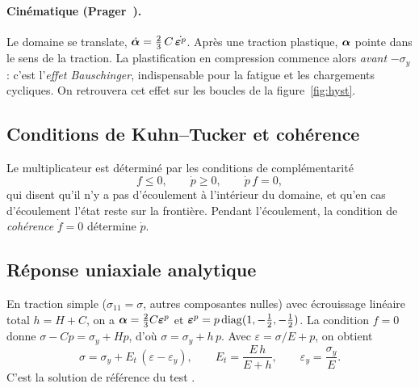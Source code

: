 \paragraph{Cinématique (Prager~\cite{prager1956}).} Le domaine se translate, $\dot{\boldsymbol{\alpha}} = \frac23\,C\,\dot{\boldsymbol{\varepsilon}^{p}}$. Après une traction plastique, $\boldsymbol{\alpha}$ pointe dans le sens de la traction. La plastification en compression commence alors \emph{avant} $-\sigma_y$ : c'est l'\emph{effet Bauschinger}, indispensable pour la fatigue et les chargements cycliques. On retrouvera cet effet sur les boucles de la figure~\ref{fig:hyst}.

\subsection{Conditions de Kuhn--Tucker et cohérence}

Le multiplicateur est déterminé par les conditions de complémentarité
\begin{equation}
f\le0,\qquad \dot p\ge0,\qquad \dot p\,f=0,
\end{equation}
qui disent qu'il n'y a pas d'écoulement à l'intérieur du domaine, et qu'en cas d'écoulement l'état reste sur la frontière. Pendant l'écoulement, la condition de \emph{cohérence} $\dot f=0$ détermine $\dot p$.

\subsection{Réponse uniaxiale analytique}\label{sec:uniax}

En traction simple ($\sigma_{11}=\sigma$, autres composantes nulles) avec écrouissage linéaire total $h=H+C$, on a $\boldsymbol{\alpha} = \frac{2}{3}C\boldsymbol{\varepsilon}^{p}$ et $\boldsymbol{\varepsilon}^{p} = p\,\mathrm{diag}(1,-\frac12,-\frac12)$. La condition $f=0$ donne $\sigma - Cp = \sigma_y + Hp$, d'où $\sigma=\sigma_y+h\,p$. Avec $\varepsilon = \sigma/E + p$, on obtient
\begin{equation}
\sigma = \sigma_y + E_t\,(\varepsilon-\varepsilon_y),\qquad E_t = \frac{E\,h}{E+h},\qquad \varepsilon_y=\frac{\sigma_y}{E}.
\label{eq:Et}
\end{equation}
C'est la solution de référence du test .
